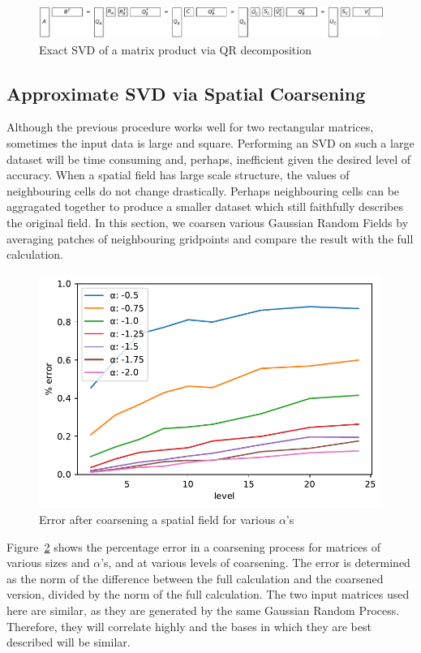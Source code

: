\documentclass{acm_proc_article-sp}
\begin{document}
\begin{figure}[h]
\begin{center}
\includegraphics[width=\columnwidth]{Results/qrProductSVD.pdf}
\caption[Exact SVD via QR decomposition]{Exact SVD of a matrix product via QR decomposition}
\label{fig:qrProductSVD}
\end{center}
\end{figure}

\subsection{Approximate SVD via Spatial Coarsening}
\label{sec:Techniques Approximate SVD via Spatial Coarsening}

Although the previous procedure works well for two rectangular matrices, sometimes the input data is large and square. Performing an SVD on such a large dataset will be time consuming and, perhaps, inefficient given the desired level of accuracy. When a spatial field has large scale structure, the values of neighbouring cells do not change drastically. Perhaps neighbouring cells can be aggragated together to produce a smaller dataset which still faithfully describes the original field. In this section, we coarsen various Gaussian Random Fields by averaging patches of neighbouring gridpoints and compare the result with the full calculation.

\begin{figure}[h]
\begin{center}
\includegraphics[width=0.8\columnwidth]{Results/plotSingleSpatialFieldViaCoarsening.pdf}
\caption[Error after coarsening a spatial field]{Error after coarsening a spatial field for various $\alpha$'s}
\label{fig:plotSingleSpatialFieldViaCoarsening}
\end{center}
\end{figure}
Figure~\ref{fig:plotSingleSpatialFieldViaCoarsening} shows the percentage error in a coarsening process for matrices of various sizes and $\alpha$'s, and at various levels of coarsening. The error is determined as the norm of the difference between the full calculation and the coarsened version, divided by the norm of the full calculation. The two input matrices used here are similar, as they are generated by the same Gaussian Random Process. Therefore, they will correlate highly and the bases in which they are best described will be similar.
\end{document}
